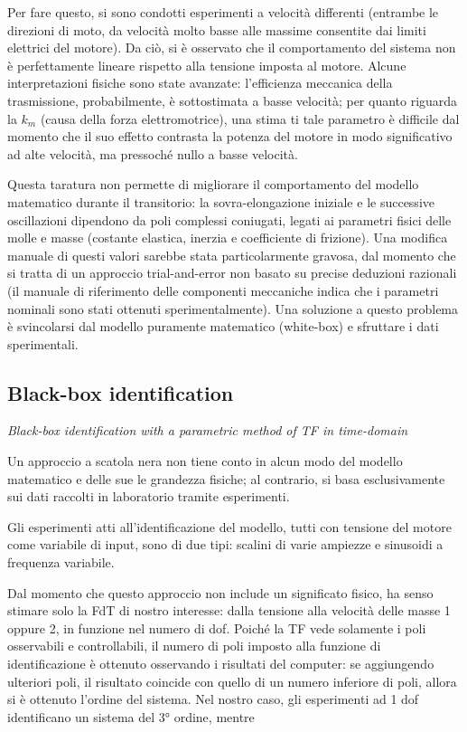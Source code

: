 Per fare questo, si sono condotti esperimenti a velocità differenti (entrambe le direzioni di moto, da velocità molto basse alle massime consentite dai limiti elettrici del motore). Da ciò, si è osservato che il comportamento del sistema non è perfettamente lineare rispetto alla tensione imposta al motore. Alcune interpretazioni fisiche sono state avanzate: l'efficienza meccanica della trasmissione, probabilmente, è sottostimata a basse velocità; per quanto riguarda la $k_m$ (causa della forza elettromotrice), una stima ti tale parametro è difficile dal momento che il suo effetto contrasta la potenza del motore in modo significativo ad alte velocità, ma pressoché nullo a basse velocità.


Questa taratura non permette di migliorare il comportamento del modello matematico durante il transitorio: la sovra-elongazione iniziale e le successive oscillazioni dipendono da poli complessi coniugati, legati ai parametri fisici delle molle e masse (costante elastica, inerzia e coefficiente di frizione). Una modifica manuale di questi valori sarebbe stata particolarmente gravosa, dal momento che si tratta di un approccio trial-and-error non basato su precise deduzioni razionali (il manuale di riferimento delle componenti meccaniche indica che i parametri nominali sono stati ottenuti sperimentalmente).
Una soluzione a questo problema è svincolarsi dal modello puramente matematico (white-box) e sfruttare i dati sperimentali.


\subsection{Black-box identification}

\textit{Black-box identification with a parametric method of TF in time-domain}
\\ \par Un approccio a scatola nera non tiene conto in alcun modo del modello matematico e delle sue le grandezza fisiche; al contrario, si basa esclusivamente sui dati raccolti in laboratorio tramite esperimenti.

Gli esperimenti atti all'identificazione del modello, tutti con tensione del motore come variabile di input, sono di due tipi: scalini di varie ampiezze e sinusoidi a frequenza variabile. 



Dal momento che questo approccio non include un significato fisico, ha senso stimare solo la FdT di nostro interesse: dalla tensione alla velocità delle masse 1 oppure 2, in funzione nel numero di dof. Poiché la TF vede solamente i poli osservabili e controllabili, il numero di poli imposto alla funzione di identificazione è ottenuto osservando i risultati del computer: se aggiungendo ulteriori poli, il risultato coincide con quello di un numero inferiore di poli, allora si è ottenuto l'ordine del sistema.
Nel nostro caso, gli esperimenti ad 1 dof identificano un sistema del 3° ordine, mentre 

